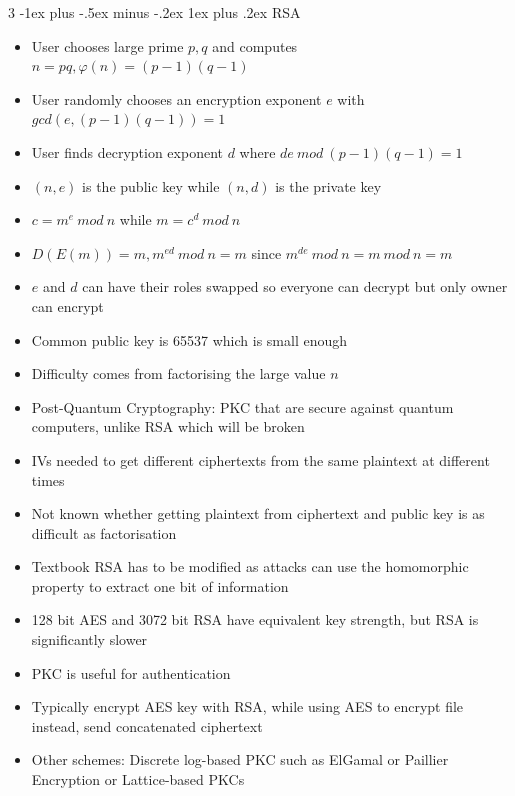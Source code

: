 \documentclass[10pt, landscape]{article}
\makeatletter
\renewcommand{\subsubsection}{\@startsection{subsubsection}{4}{0mm}%
                                {-1ex plus -.5ex minus -.2ex}%
                                {1ex plus .2ex}%
                                {\normalfont\small\bfseries}}%
\makeatother
\begin{document}
\begin{multicols*}{3}
\subsubsection{RSA}
\begin{itemize}
    \item User chooses large prime $p,q$ and computes $n=pq, \varphi(n)=(p-1)(q-1)$
    \item User randomly chooses an encryption exponent $e$ with $gcd(e, (p-1)(q-1)) = 1$
    \item User finds decryption exponent $d$ where $de\ mod \ (p-1)(q-1)=1$
    \item $(n,e)$ is the public key while $(n,d)$ is the private key
    \item $c=m^e \ mod \ n$ while $m=c^d\ mod \ n$
    \item $D(E(m))=m, m^{ed} \ mod\ n = m$ since $m^{de}\ mod \ n = m\ mod\ n = m$
    \item $e$ and $d$ can have their roles swapped so everyone can decrypt but only owner can encrypt
    \item Common public key is 65537 which is small enough
    \item Difficulty comes from factorising the large value $n$
    \item Post-Quantum Cryptography: PKC that are secure against quantum computers, unlike RSA which will be broken
    \item IVs needed to get different ciphertexts from the same plaintext at different times
    \item Not known whether getting plaintext from ciphertext and public key is as difficult as factorisation
    \item Textbook RSA has to be modified as attacks can use the homomorphic property to extract one bit of information
    \item 128 bit AES and 3072 bit RSA have equivalent key strength, but RSA is significantly slower
    \item PKC is useful for authentication
    \item Typically encrypt AES key with RSA, while using AES to encrypt file instead, send concatenated ciphertext
    \item Other schemes: Discrete log-based PKC such as ElGamal or Paillier Encryption or Lattice-based PKCs
\end{itemize}


\end{multicols*}
\end{document}
